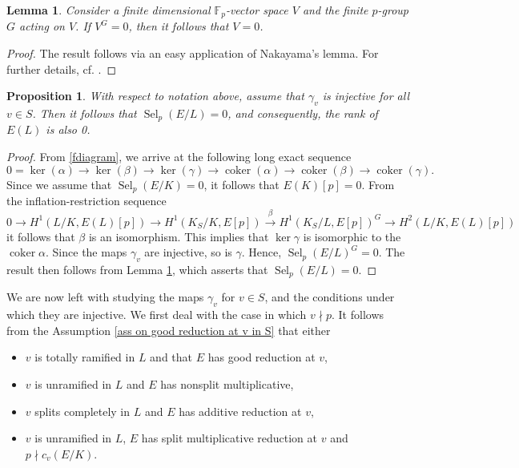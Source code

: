 \documentclass[12pt]{amsart}
\newtheorem{lemma}[theorem]{Lemma}
\newtheorem{proposition}[theorem]{Proposition}
\newcommand{\F}{\mathbb{F}}
\newcommand{\op}[1]{\operatorname{#1}}
\numberwithin{equation}{section}
\begin{document}
\begin{lemma}\label{lemma V^G=0 implies V=0}    Consider a finite dimensional $\F_p$-vector space $V$ and the finite $p$-group $G$ acting on $V$. If $V^G=0$, then it follows that $V=0$.\end{lemma}

\begin{proof}
The result follows via an easy application of Nakayama's lemma. For further details, cf. \cite[Lemma 4.2]{muller2024hilbert}. 
\end{proof}



\begin{proposition}\label{SelpL=0 propn}
    With respect to notation above, assume that $\gamma_v$ is injective for all $v\in S$. Then it follows that $\op{Sel}_p(E/L)=0$, and consequently, the rank of $E(L)$ is also 0.
\end{proposition}
\begin{proof}
  From \eqref{fdiagram}, we arrive at the following long exact sequence
\begin{equation}\label{snake lemma exact sequence}
    0=\op{ker}(\alpha)\rightarrow \op{ker}(\beta)\rightarrow \op{ker}(\gamma)\rightarrow \op{coker}(\alpha)\rightarrow \op{coker}(\beta)\rightarrow \op{coker}(\gamma).
\end{equation}
Since we assume that $\op{Sel}_p(E/K)=0$, it follows that $E(K)[p]=0$. From the inflation-restriction sequence
\[0\rightarrow H^1(L/K, E(L)[p])\rightarrow H^1(K_S/K, E[p])\xrightarrow{\beta} H^1(K_S/L, E[p])^G\rightarrow H^2(L/K, E(L)[p])\] 
it follows that $\beta$ is an isomorphism. This implies that $\op{ker}\gamma$ is isomorphic to the $\op{coker}\alpha$. Since the maps $\gamma_v$ are injective, so is $\gamma$. Hence, $\op{Sel}_p(E/L)^G=0$. The result then follows from Lemma \ref{lemma V^G=0 implies V=0}, which asserts that 	$\op{Sel}_p(E/L)=0$.
\end{proof}

\par We are now left with studying the maps $\gamma_v$ for $v\in S$, and the conditions under which they are injective. We first deal with the case in which $v\nmid p$. It follows from the Assumption \ref{ass on good reduction at v in S} that either
\begin{itemize}
    \item $v$ is totally ramified in $L$ and that $E$ has good reduction at $v$,
    \item $v$ is unramified in $L$ and $E$ has nonsplit multiplicative,
    \item $v$ splits completely in $L$ and $E$ has additive reduction at $v$,
    \item $v$ is unramified in $L$, $E$ has split multiplicative reduction at $v$ and $p\nmid c_v(E/K)$. 
\end{itemize}
\end{document}

